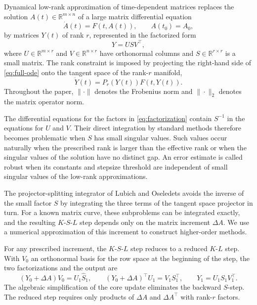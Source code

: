 \documentclass[]{article}
\numberwithin{equation}{section}
\theoremstyle{plain}
\theoremstyle{remark}
\numberwithin{algorithm}{section}
\newcommand{\R}{\mathbb{R}}
\begin{document}
Dynamical low-rank approximation of time-dependent matrices
\cite{KochLubich2007} replaces the solution
\(A(t)\in\R^{m\times n}\) of a large matrix differential equation
\begin{equation}\label{eq:full-ode}
 \dot A(t)=F(t,A(t)),\qquad A(t_0)=A_0,
\end{equation}
by matrices \(Y(t)\) of rank \(r\), represented in the factorized form
\begin{equation}\label{eq:factorization}
 Y=USV^\top,
\end{equation}
where \(U\in\R^{m\times r}\) and \(V\in\R^{n\times r}\) have
orthonormal columns and \(S\in\R^{r\times r}\) is a small matrix.  The
rank constraint is imposed by projecting the right-hand side of
\eqref{eq:full-ode} onto the tangent space of the rank-\(r\) manifold,
\begin{equation}\label{eq:projected-ode}
 \dot Y(t)=P_r(Y(t))F(t,Y(t)).
\end{equation}
Throughout the paper, \(\|\cdot\|\) denotes the Frobenius norm and
\(\|\cdot\|_2\) denotes the matrix operator norm.

The differential equations for the factors in \eqref{eq:factorization}
contain \(S^{-1}\) in the equations for \(U\) and \(V\).  Their direct
integration by standard methods therefore becomes problematic when \(S\)
has small singular values.  Such values occur naturally when the prescribed
rank is larger than the effective rank or when the singular values of the
solution have no distinct gap.  An error estimate is called robust when its
constants and stepsize threshold are independent of small singular values
of the low-rank approximations.

The projector-splitting integrator of Lubich and Oseledets
\cite{LubichOseledets2014} avoids the inverse of the small factor \(S\) by
integrating the three terms of the tangent space projector in turn.
For a known matrix curve, these subproblems can be integrated exactly,
and the resulting \(K\)-\(S\)-\(L\) step depends only on the matrix
increment \(\Delta A\).  We use a numerical approximation of this
increment to construct higher-order methods.

For any prescribed increment, the \(K\)-\(S\)-\(L\) step reduces to a
reduced \(K\)-\(L\) step.  With \(V_0\) an orthonormal basis for the row space
at the beginning of the step, the two factorizations and the output are
\begin{equation}\label{eq:two-factorizations-intro}
 (Y_0+\Delta A)V_0=U_1\widehat S_1,
 \qquad (Y_0+\Delta A)^\top U_1=V_1S_1^\top,
 \qquad Y_1=U_1S_1V_1^\top.
\end{equation}
The algebraic simplification of the core update eliminates the backward
\(S\)-step.  The reduced step requires only products of \(\Delta A\)
and \(\Delta A^\top\) with rank-\(r\) factors.
\end{document}
